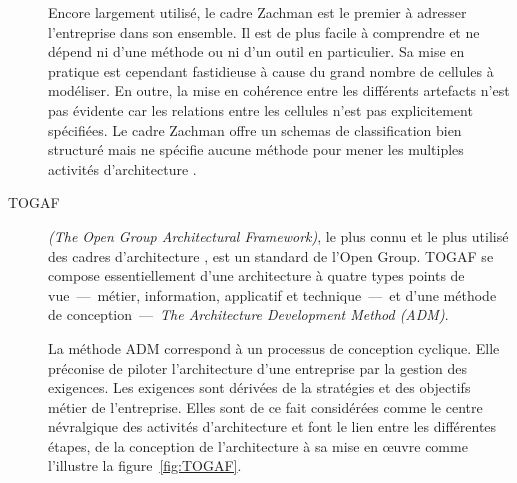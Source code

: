 \begin{description}
\begin{itemize}
	\end{itemize}

Encore largement utilisé, le cadre Zachman est le premier à adresser l'entreprise dans son ensemble. Il est de plus facile à comprendre et ne dépend ni d'une méthode ou ni d'un outil en particulier. Sa mise en pratique est cependant fastidieuse à cause du grand nombre de cellules à modéliser. En outre, la mise en cohérence entre les différents artefacts n'est pas évidente car les relations entre les cellules n'est pas explicitement spécifiées. Le cadre Zachman offre un schemas de classification bien structuré mais ne spécifie aucune méthode pour mener les multiples activités d'architecture \cite{lankhorst2013enterprise}.


\item[TOGAF] \textit{(The Open Group Architectural Framework)}, le plus connu et le plus utilisé des cadres d'architecture \cite{winter2008enterprise}, est un standard de l'Open Group. TOGAF se compose essentiellement d'une architecture à quatre types points de vue~—~métier, information, applicatif et technique~—~et d'une méthode de conception~—~\textit{The Architecture Development Method (ADM)}. 

La méthode ADM correspond à un processus de conception cyclique. Elle préconise de piloter l'architecture d'une entreprise par la gestion des exigences. Les exigences sont dérivées de la stratégies et des objectifs métier de l'entreprise. Elles sont de ce fait considérées comme le centre névralgique des activités d'architecture et font le lien entre les différentes étapes, de la conception de l'architecture à sa mise en œuvre comme l'illustre la figure~\ref{fig:TOGAF}. 



\end{description}
